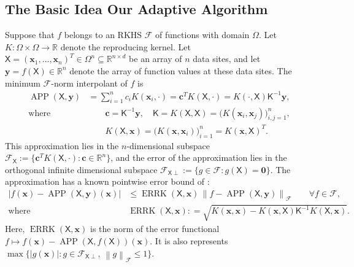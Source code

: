 \documentclass[]{mcom-l}
\theoremstyle{plain}
\theoremstyle{definition}
\DeclareMathOperator{\errK}{ERRK}
\DeclareMathOperator{\APP}{APP}
\newcommand{\reals}{{\mathbb{R}}}
\newcommand{\mK}{\mathsf{K}}
\newcommand{\mX}{\mathsf{X}}
\newcommand{\bzero}{\boldsymbol{0}}
\newcommand{\bc}{{\boldsymbol{c}}}
\newcommand{\bx}{{\boldsymbol{x}}}
\newcommand{\by}{{\boldsymbol{y}}}
\newcommand{\cx}{{\Omega}}
\newcommand{\calf}{{\mathcal{F}}}
\def\abs#1{\ensuremath{\left \lvert #1 \right \rvert}}
\newcommand{\norm}[2][{}]{\ensuremath{\left \lVert #2 \right \rVert}_{#1}}
\newcommand{\bignorm}[2][{}]{\ensuremath{\bigl \lVert #2 \bigr \rVert}_{#1}}
\begin{document}
\subsection{The Basic Idea Our Adaptive Algorithm} \label{sec:basicIdea}
Suppose that $f$ belongs to an RKHS $\calf$ of functions with domain $\cx$.  Let $K: \Omega \times \Omega \to \reals$ denote the reproducing kernel.  Let $\mX = (\bx_1, \ldots, \bx_n)^T \in \cx^n \subseteq \reals^{n \times d}$ be an array of $n$ data sites, and let $\by  = f(\mX) \in \reals^n$ denote the array of function values at these data sites.  
The minimum $\calf$-norm interpolant of $f$ is 
\begin{subequations} \label{eq:RKHSAPP}
\begin{align} 
\APP(\mX,\by) &= \sum_{i=1}^n c_i K(\bx_i,\cdot) = \bc^T K(\mX,\cdot) =  K(\cdot, \mX) \mK^{-1} \by, \\
 \text{where } & \qquad \bc = \mK^{-1} \by, \quad \mK = K(\mX,\mX) = \bigl( K(\bx_i,\bx_j) \bigr)_{i,j=1}^n,  \\
& \qquad  K(\mX,\bx) = \bigl(K(\bx,\bx_i) \bigr)_{i=1}^n =  K(\bx, \mX)^T.
\end{align}
\end{subequations}
This approximation lies in the $n$-dimensional subspace $\calf_{\mX} := \{\bc^T K(\mX,\cdot) : \bc \in \reals^n \}$, and the error of the approximation lies in the orthogonal infinite dimensional subspace $\calf_{\mX \perp} := \{g \in \calf : g(\mX) = \bzero\}$.
The approximation has a known pointwise error bound of \cite{bibid}:
\begin{subequations} \label{eq:RKHSErrBd}
\begin{align}
\abs{f(\bx) - \APP(\mX,\by)(\bx)} & \le  \errK(\mX,\bx) \, \bignorm[\calf]{f - \APP(\mX,\by)}  \qquad \forall f \in \calf,  \\
\text{where} & \errK(\mX,\bx) : = \sqrt{K(\bx,\bx) - K(\bx,\mX) \mK^{-1} K(\mX,\bx)}.
\end{align}
\end{subequations}
Here, $\errK(\mX,\bx)$ is the norm of the error functional $f \mapsto f(\bx)-\APP(\mX,f(\mX))(\bx)$.  It is also represents $\max \{\abs{g(\bx)} : g \in \calf_{\mX \perp}, \ \norm[\calf]{g} \le 1\}$.
\end{document}
